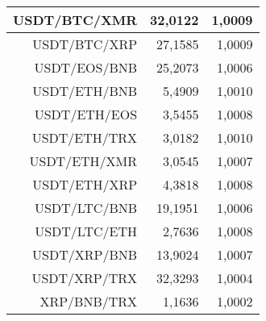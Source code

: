 \begin{table}
\begin{tabular}{|| r | r | r ||}
 \hline USDT/BTC/XMR & 32,0122 & 1,0009\\ 
 \hline USDT/BTC/XRP & 27,1585 & 1,0009\\ 
 \hline USDT/EOS/BNB & 25,2073 & 1,0006\\ 
 \hline USDT/ETH/BNB & 5,4909 & 1,0010\\ 
 \hline USDT/ETH/EOS & 3,5455 & 1,0008\\ 
 \hline USDT/ETH/TRX & 3,0182 & 1,0010\\ 
 \hline USDT/ETH/XMR & 3,0545 & 1,0007\\ 
 \hline USDT/ETH/XRP & 4,3818 & 1,0008\\ 
 \hline USDT/LTC/BNB & 19,1951 & 1,0006\\ 
 \hline USDT/LTC/ETH & 2,7636 & 1,0008\\ 
 \hline USDT/XRP/BNB & 13,9024 & 1,0007\\ 
 \hline USDT/XRP/TRX & 32,3293 & 1,0004\\ 
 \hline XRP/BNB/TRX & 1,1636 & 1,0002\\ 
 \hline
\end{tabular}
\end{table}